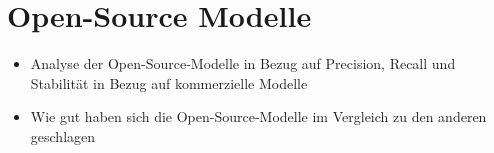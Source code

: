 \section{Open-Source Modelle}\label{sec:open-source-modelle}

\begin{itemize}
    \item Analyse der Open-Source-Modelle in Bezug auf Precision, Recall und Stabilität in Bezug auf kommerzielle Modelle
    \item Wie gut haben sich die Open-Source-Modelle im Vergleich zu den anderen geschlagen
\end{itemize}